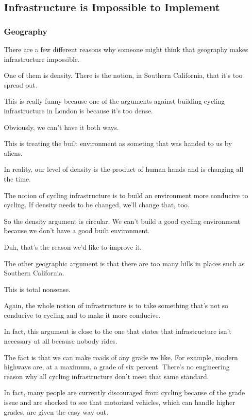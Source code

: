 \subsection{Infrastructure is Impossible to Implement}

\subsubsection{Geography} 

There are a few different reasons why someone might think that geography makes infrastructure impossible.

One of them is density. There is the notion, in Southern California, that it's too spread out.

This is really funny because one of the arguments against building cycling infrastructure in London is because it's too dense.

Obviously, we can't have it both ways.

This is treating the built environment as someting that was handed to us by aliens.

In reality, our level of density is the product of human hands and is changing all the time.

The notion of cycling infrastructure is to build an environment more conducive to cycling. If density needs to be changed, we'll change that, too. 

So the density argument is circular. We can't build a good cycling environment because we don't have a good built environment. 

Duh, that's the reason we'd like to improve it.

The other geographic argument is that there are too many hills in places such as Southern California.

This is total nonsense.

Again, the whole notion of infrastructure is to take something that's not so conducive to cycling and to make it more conducive. 

In fact, this argument is close to the one that states that infrastructure isn't necessary at all because nobody rides.

The fact is that we can make roads of any grade we like. For example, modern highways are, at a maximum, a grade of six percent. There's no engineering reason why all cycling infrastructure don't meet that same standard.

In fact, many people are currently discouraged from cycling because of the grade issue and are shocked to see that motorized vehicles, which can handle higher grades, are given the easy way out.

